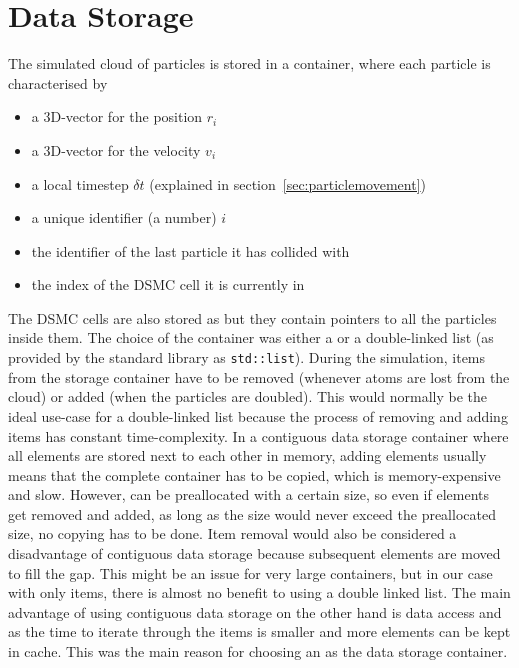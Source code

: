 \section{Data Storage}
\label{sec:eva_data_storage}
%
The simulated cloud of particles is stored in a \stdvector container, where each particle is characterised by
\begin{itemize}
    \item a 3D-vector for the position $r_i$
    \item a 3D-vector for the velocity $v_i$
    \item a local timestep $\delta t$ (explained in section~\ref{sec:particlemovement})
    \item a unique identifier (a number) $i$
    \item the identifier of the last particle it has collided with
    \item the index of the DSMC cell it is currently in
\end{itemize}
%
The DSMC cells are also stored as \stdvector but they contain pointers to all the particles inside them.
The choice of the container was either a \stdvector or a double-linked list (as provided by the \Cpp standard library as \texttt{std::list}). During the simulation, items from the storage container have to be removed (whenever atoms are lost from the cloud) or added (when the particles are doubled). This would normally be the ideal use-case for a double-linked list because the process of removing and adding items has constant time-complexity. In a contiguous data storage container where all elements are stored next to each other in memory, adding elements usually means that the complete container has to be copied, which is memory-expensive and slow. However, \stdvector can be preallocated with a certain size, so even if elements get removed and added, as long as the size would never exceed the preallocated size, no copying has to be done. Item removal would also be considered a disadvantage of contiguous data storage because subsequent elements are moved to fill the gap. This might be an issue for very large containers, but in our case with only  items, there is almost no benefit to using a double linked list.
The main advantage of using contiguous data storage on the other hand is data access and as the time to iterate through the items is smaller and more elements can be kept in cache. This was the main reason for choosing an \stdvector as the data storage container.
%

